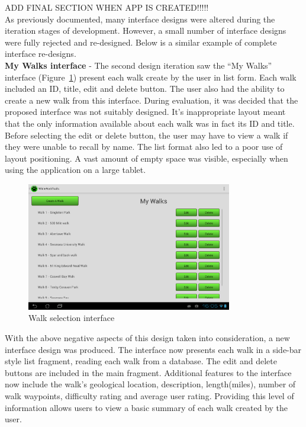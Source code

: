 \documentclass[11pt,a4paper]{report}
\begin{document}
ADD FINAL SECTION WHEN APP IS CREATED!!!!!\\

As previously documented, many interface designs were altered during the iteration stages of development. However, a small number of interface designs were fully rejected and re-designed. Below is a similar example of complete interface re-designs.\\

\textbf{My Walks interface} - The second design iteration saw the ``My Walks'' interface (Figure~\ref{fig:app_my_walks_view}) present each walk create by the user in list form. Each walk included an ID, title, edit and delete button. The user also had the ability to create a new walk from this interface. During evaluation, it was decided that the proposed interface was not suitably designed. It's inappropriate layout meant that the only information available about each walk was in fact its ID and title. Before selecting the edit or delete button, the user may have to view a walk if they were unable to recall by name. The list format also led to a poor use of layout positioning. A vast amount of empty space was visible, especially when using the application on a large tablet.

\begin{figure}[H]
    \centering
    \includegraphics[width=0.8\textwidth]{chris/app_my_walks_view}
    \caption{Walk selection interface}
    \label{fig:app_my_walks_view}
\end{figure}

With the above negative aspects of this design taken into consideration, a new interface design was produced. The interface now presents each walk in a side-bar style list fragment, reading each walk from a database. The edit and delete buttons are included in the main fragment. Additional features to the interface now include the walk's geological location, description, length(miles), number of walk waypoints, difficulty rating and average user rating. Providing this level of information allows users to view a basic summary of each walk created by the user.\\
\end{document}
